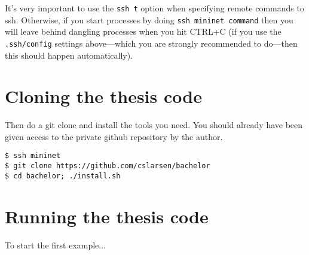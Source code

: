 It's very important to use the \texttt{ssh \-{}t} option when specifying
remote commands to ssh. Otherwise, if you start processes by doing
\texttt{ssh mininet command} then you will leave behind dangling processes
when you hit CTRL+C (if you use the \texttt{.ssh/config} settings
above---which you are strongly recommended to do---then this should
happen automatically).

\section{Cloning the thesis code}

Then do a git clone and install the tools you need. You should already have
been given access to the private github repository by the author.

\begin{Verbatim}
$ ssh mininet
$ git clone https://github.com/cslarsen/bachelor
$ cd bachelor; ./install.sh
\end{Verbatim}

\section{Running the thesis code}

To start the first example...

